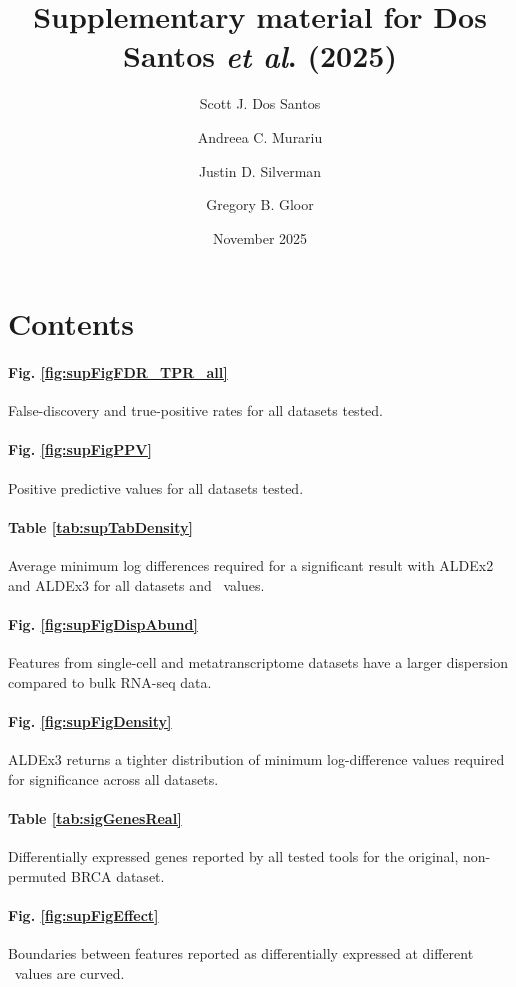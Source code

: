 \documentclass[11pt,a4paper]{article}
\title{\textbf{Supplementary material for Dos Santos \textit{et al}. (2025)}}
\author[$\dagger$ ]{Scott J. Dos Santos}
\author[$\dagger$ ]{Andreea C. Murariu}
\author[ ]{Justin D. Silverman}
\author[*]{Gregory B. Gloor}
\affil[$\dagger$]{Equal contribution}
\affil[*]{Corresponding author}
\date{November 2025}
\begin{document}
\maketitle

\section*{Contents}

\paragraph*{Fig. \ref{fig:supFigFDR_TPR_all}}
False-discovery and true-positive rates for all datasets tested.

\paragraph*{Fig. \ref{fig:supFigPPV}}
Positive predictive values for all datasets tested.

\paragraph*{Table \ref{tab:supTabDensity}}
Average minimum log differences required for a significant result with ALDEx2 and ALDEx3 for all datasets and \textgamma~values.

\paragraph*{Fig. \ref{fig:supFigDispAbund}}
Features from single-cell and metatranscriptome datasets have a larger dispersion compared to bulk RNA-seq data.

\paragraph*{Fig. \ref{fig:supFigDensity}}
ALDEx3 returns a tighter distribution of minimum log-difference values required for significance across all datasets.

\paragraph*{Table \ref{tab:sigGenesReal}}
Differentially expressed genes reported by all tested tools for the original, non-permuted BRCA dataset.

\paragraph*{Fig. \ref{fig:supFigEffect}}
Boundaries between features reported as differentially expressed at different \textgamma~values are curved.
\end{document}
